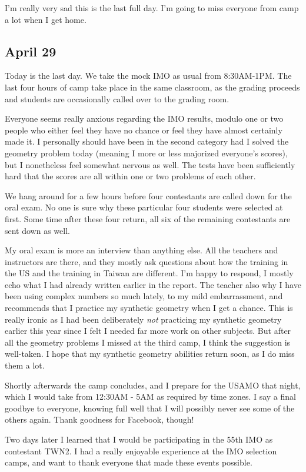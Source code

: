 \documentclass[11pt]{scrreprt}
\begin{document}
I'm really very sad this is the last full day. I'm going to miss everyone from camp a lot when I get home.

\subsection{April 29}
Today is the last day. We take the mock IMO as usual from 8:30AM-1PM. The last four hours of camp take place in the same classroom, as the grading proceeds and students are occasionally called over to the grading room.

Everyone seems really anxious regarding the IMO results, modulo one or two people who either feel they have no chance or feel they have almost certainly made it. I personally should have been in the second category had I solved the geometry problem today (meaning I more or less majorized everyone's scores), but I nonetheless feel somewhat nervous as well. The tests have been sufficiently hard that the scores are all within one or two problems of each other.

We hang around for a few hours before four contestants are called down for the oral exam. No one is sure why these particular four students were selected at first. Some time after these four return, all six of the remaining contestants are sent down as well.

My oral exam is more an interview than anything else. All the teachers and instructors are there, and they mostly ask questions about how the training in the US and the training in Taiwan are different. I'm happy to respond, I mostly echo what I had already written earlier in the report.
The teacher also why I have been using complex numbers so much lately, to my mild embarrassment, and recommends that I practice my synthetic geometry when I get a chance. This is really ironic as I had been deliberately \emph{not} practicing my synthetic geometry earlier this year since I felt I needed far more work on other subjects. But after all the geometry problems I missed at the third camp, I think the suggestion is well-taken. I hope that my synthetic geometry abilities return soon, as I do miss them a lot.

Shortly afterwards the camp concludes, and I prepare for the USAMO that night, which I would take from 12:30AM - 5AM as required by time zones. I say a final goodbye to everyone, knowing full well that I will possibly never see some of the others again. Thank goodness for Facebook, though!

Two days later I learned that I would be participating in the 55th IMO as contestant TWN2. I had a really enjoyable experience at the IMO selection camps, and want to thank everyone that made these events possible.
\end{document}
